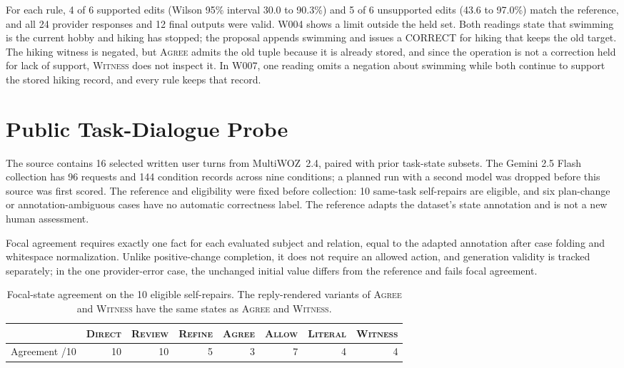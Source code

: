 \documentclass[acmsmall,review]{acmart}
\newcommand{\agree}{\textsc{Agree}}
\newcommand{\allow}{\textsc{Allow}}
\newcommand{\literal}{\textsc{Literal}}
\newcommand{\witness}{\textsc{Witness}}
\newcommand{\review}{\textsc{Review}}
\newcommand{\direct}{\textsc{Direct}}
\newcommand{\refine}{\textsc{Refine}}
\begin{document}
For each rule, 4 of 6 supported edits (Wilson 95\% interval 30.0 to 90.3\%) and 5 of 6 unsupported edits (43.6 to 97.0\%) match the reference, and all 24 provider responses and 12 final outputs were valid. W004 shows a limit outside the held set. Both readings state that swimming is the current hobby and hiking has stopped; the proposal appends swimming and issues a CORRECT for hiking that keeps the old target. The hiking witness is negated, but \agree{} admits the old tuple because it is already stored, and since the operation is not a correction held for lack of support, \witness{} does not inspect it. In W007, one reading omits a negation about swimming while both continue to support the stored hiking record, and every rule keeps that record.

\FloatBarrier
\setcounter{figure}{0}\setcounter{table}{0}
\renewcommand{\thefigure}{F\arabic{figure}}
\renewcommand{\thetable}{F\arabic{table}}
\section{Public Task-Dialogue Probe}
The source contains 16 selected written user turns from MultiWOZ~2.4, paired with prior task-state subsets. The Gemini 2.5 Flash collection has 96 requests and 144 condition records across nine conditions; a planned run with a second model was dropped before this source was first scored. The reference and eligibility were fixed before collection: 10 same-task self-repairs are eligible, and six plan-change or annotation-ambiguous cases have no automatic correctness label. The reference adapts the dataset's state annotation and is not a new human assessment.

Focal agreement requires exactly one fact for each evaluated subject and relation, equal to the adapted annotation after case folding and whitespace normalization. Unlike positive-change completion, it does not require an allowed action, and generation validity is tracked separately; in the one provider-error case, the unchanged initial value differs from the reference and fails focal agreement.

\begin{table}[H]
\centering
\caption{Focal-state agreement on the 10 eligible self-repairs. The reply-rendered variants of \agree{} and \witness{} have the same states as \agree{} and \witness{}.}\label{tab:F1}
\small
\setlength{\tabcolsep}{5pt}
\begin{tabular}{@{}lrrrrrrr@{}}
\toprule
 & \textbf{\direct{}} & \textbf{\review{}} & \textbf{\refine{}} & \textbf{\agree{}} & \textbf{\allow{}} & \textbf{\literal{}} & \textbf{\witness{}} \\
\midrule
Agreement /10 & 10 & 10 & 5 & 3 & 7 & 4 & 4 \\
\bottomrule
\end{tabular}
\end{table}
\end{document}
